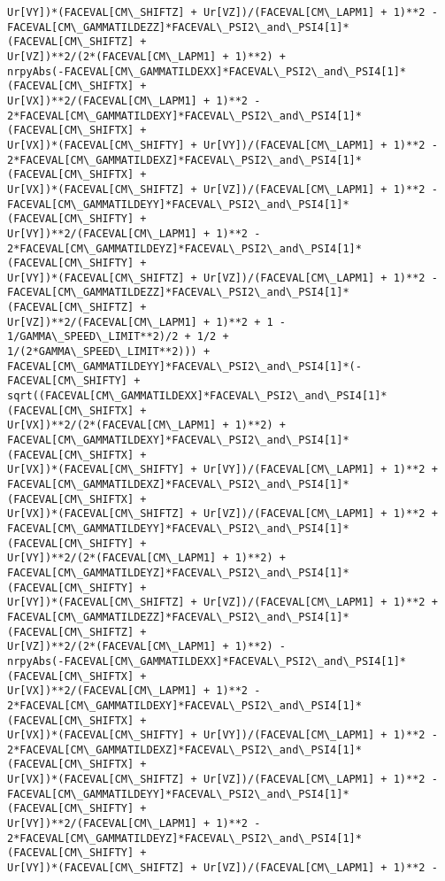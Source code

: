 \documentclass[landscape,letterpaper,10pt,english]{article}
\begin{document}
\begin{Verbatim}[commandchars=\\\{\}]
Ur[VY])*(FACEVAL[CM\_SHIFTZ] + Ur[VZ])/(FACEVAL[CM\_LAPM1] + 1)**2 -
FACEVAL[CM\_GAMMATILDEZZ]*FACEVAL\_PSI2\_and\_PSI4[1]*(FACEVAL[CM\_SHIFTZ] +
Ur[VZ])**2/(2*(FACEVAL[CM\_LAPM1] + 1)**2) +
nrpyAbs(-FACEVAL[CM\_GAMMATILDEXX]*FACEVAL\_PSI2\_and\_PSI4[1]*(FACEVAL[CM\_SHIFTX] +
Ur[VX])**2/(FACEVAL[CM\_LAPM1] + 1)**2 -
2*FACEVAL[CM\_GAMMATILDEXY]*FACEVAL\_PSI2\_and\_PSI4[1]*(FACEVAL[CM\_SHIFTX] +
Ur[VX])*(FACEVAL[CM\_SHIFTY] + Ur[VY])/(FACEVAL[CM\_LAPM1] + 1)**2 -
2*FACEVAL[CM\_GAMMATILDEXZ]*FACEVAL\_PSI2\_and\_PSI4[1]*(FACEVAL[CM\_SHIFTX] +
Ur[VX])*(FACEVAL[CM\_SHIFTZ] + Ur[VZ])/(FACEVAL[CM\_LAPM1] + 1)**2 -
FACEVAL[CM\_GAMMATILDEYY]*FACEVAL\_PSI2\_and\_PSI4[1]*(FACEVAL[CM\_SHIFTY] +
Ur[VY])**2/(FACEVAL[CM\_LAPM1] + 1)**2 -
2*FACEVAL[CM\_GAMMATILDEYZ]*FACEVAL\_PSI2\_and\_PSI4[1]*(FACEVAL[CM\_SHIFTY] +
Ur[VY])*(FACEVAL[CM\_SHIFTZ] + Ur[VZ])/(FACEVAL[CM\_LAPM1] + 1)**2 -
FACEVAL[CM\_GAMMATILDEZZ]*FACEVAL\_PSI2\_and\_PSI4[1]*(FACEVAL[CM\_SHIFTZ] +
Ur[VZ])**2/(FACEVAL[CM\_LAPM1] + 1)**2 + 1 - 1/GAMMA\_SPEED\_LIMIT**2)/2 + 1/2 +
1/(2*GAMMA\_SPEED\_LIMIT**2))) +
FACEVAL[CM\_GAMMATILDEYY]*FACEVAL\_PSI2\_and\_PSI4[1]*(-FACEVAL[CM\_SHIFTY] +
sqrt((FACEVAL[CM\_GAMMATILDEXX]*FACEVAL\_PSI2\_and\_PSI4[1]*(FACEVAL[CM\_SHIFTX] +
Ur[VX])**2/(2*(FACEVAL[CM\_LAPM1] + 1)**2) +
FACEVAL[CM\_GAMMATILDEXY]*FACEVAL\_PSI2\_and\_PSI4[1]*(FACEVAL[CM\_SHIFTX] +
Ur[VX])*(FACEVAL[CM\_SHIFTY] + Ur[VY])/(FACEVAL[CM\_LAPM1] + 1)**2 +
FACEVAL[CM\_GAMMATILDEXZ]*FACEVAL\_PSI2\_and\_PSI4[1]*(FACEVAL[CM\_SHIFTX] +
Ur[VX])*(FACEVAL[CM\_SHIFTZ] + Ur[VZ])/(FACEVAL[CM\_LAPM1] + 1)**2 +
FACEVAL[CM\_GAMMATILDEYY]*FACEVAL\_PSI2\_and\_PSI4[1]*(FACEVAL[CM\_SHIFTY] +
Ur[VY])**2/(2*(FACEVAL[CM\_LAPM1] + 1)**2) +
FACEVAL[CM\_GAMMATILDEYZ]*FACEVAL\_PSI2\_and\_PSI4[1]*(FACEVAL[CM\_SHIFTY] +
Ur[VY])*(FACEVAL[CM\_SHIFTZ] + Ur[VZ])/(FACEVAL[CM\_LAPM1] + 1)**2 +
FACEVAL[CM\_GAMMATILDEZZ]*FACEVAL\_PSI2\_and\_PSI4[1]*(FACEVAL[CM\_SHIFTZ] +
Ur[VZ])**2/(2*(FACEVAL[CM\_LAPM1] + 1)**2) -
nrpyAbs(-FACEVAL[CM\_GAMMATILDEXX]*FACEVAL\_PSI2\_and\_PSI4[1]*(FACEVAL[CM\_SHIFTX] +
Ur[VX])**2/(FACEVAL[CM\_LAPM1] + 1)**2 -
2*FACEVAL[CM\_GAMMATILDEXY]*FACEVAL\_PSI2\_and\_PSI4[1]*(FACEVAL[CM\_SHIFTX] +
Ur[VX])*(FACEVAL[CM\_SHIFTY] + Ur[VY])/(FACEVAL[CM\_LAPM1] + 1)**2 -
2*FACEVAL[CM\_GAMMATILDEXZ]*FACEVAL\_PSI2\_and\_PSI4[1]*(FACEVAL[CM\_SHIFTX] +
Ur[VX])*(FACEVAL[CM\_SHIFTZ] + Ur[VZ])/(FACEVAL[CM\_LAPM1] + 1)**2 -
FACEVAL[CM\_GAMMATILDEYY]*FACEVAL\_PSI2\_and\_PSI4[1]*(FACEVAL[CM\_SHIFTY] +
Ur[VY])**2/(FACEVAL[CM\_LAPM1] + 1)**2 -
2*FACEVAL[CM\_GAMMATILDEYZ]*FACEVAL\_PSI2\_and\_PSI4[1]*(FACEVAL[CM\_SHIFTY] +
Ur[VY])*(FACEVAL[CM\_SHIFTZ] + Ur[VZ])/(FACEVAL[CM\_LAPM1] + 1)**2 -

\end{Verbatim}
\end{document}
